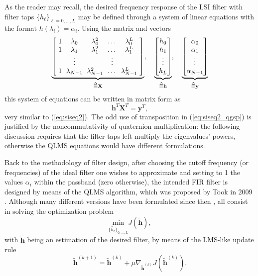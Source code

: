 As the reader may recall, the desired frequency response of the LSI filter with filter taps $\{h_\ell\}_{\ell=0,\dots, L}$ may be defined through a system of linear equations with the format $h(\lambda_i) = \alpha_i$. Using the matrix and vectors
\begin{align}
\label{eq:siseq2_qgsp_aux}
\setlength{\arraycolsep}{3pt}
\underbrace{
\left[
\begin{array}{ccccc}
1 & \lambda_0 & \lambda^2_0 & \dots & \lambda^L_0 \\
1 & \lambda_1 & \lambda^2_1 & \dots & \lambda^L_1 \\
& \vdots & & \vdots & \\
1 & \lambda_{N-1} & \lambda^2_{N-1} & \dots & \lambda^L_{N-1} \\
\end{array}\right]
}_{\overset{\Delta}{=} \mathbf{X}}, \quad
\underbrace{
\begin{bmatrix}
h_0 \\
h_1 \\
\vdots \\
h_L
\end{bmatrix}
}_{\overset{\Delta}{=} \mathbf{h}}, \quad 
\underbrace{
\begin{bmatrix}
\alpha_0 \\
\alpha_1 \\
\vdots \\
\alpha_{N-1}
\end{bmatrix}
}_{\overset{\Delta}{=} \mathbf{y}}
\end{align}
this system of equations can be written in matrix form as
\begin{equation}
\label{eq:siseq2_qgsp}
\mathbf{h}^T \mathbf{X}^T = \mathbf{y}^T,
\end{equation}
very similar to (\ref{eq:siseq2}). The odd use of transposition in (\ref{eq:siseq2_qgsp}) is justified by the noncommutativity of quaternion multiplication: the following discussion requires that the filter taps left-multiply the eigenvalues' powers, otherwise the QLMS equations would have different formulations.

Back to the methodology of filter design, after choosing the cutoff frequency (or frequencies) of the ideal filter one wishes to approximate and setting to 1 the values $\alpha_i$ within the passband (zero otherwise),
the intended FIR filter is designed by means of the QLMS algorithm, which was proposed by Took in 2009 \cite{took2008quaternion}. Although many different versions have been formulated since then \cite{ogunfunmi2015adaptive, almeida2014low, ortolani2016quaternion}, all consist in solving the optimization problem
\begin{equation}
\label{eq:opt}
\underset{\{\widetilde{h_\ell}\}_{0, \dots, L}}{\text{min}} J(\mathbf{\widetilde{h}}),
\end{equation}
with $\mathbf{\widetilde{h}}$ being an estimation of the desired filter, by means of the LMS-like update rule
\begin{equation}
\label{eq:updateqlms}
\mathbf{\widetilde{h}}^{(k+1)} = 
\mathbf{\widetilde{h}}^{(k)} +
\mu \nabla_{\mathbf{\widetilde{h}}^{(k)}} J(\mathbf{\widetilde{h}}^{(k)}).
\end{equation}

